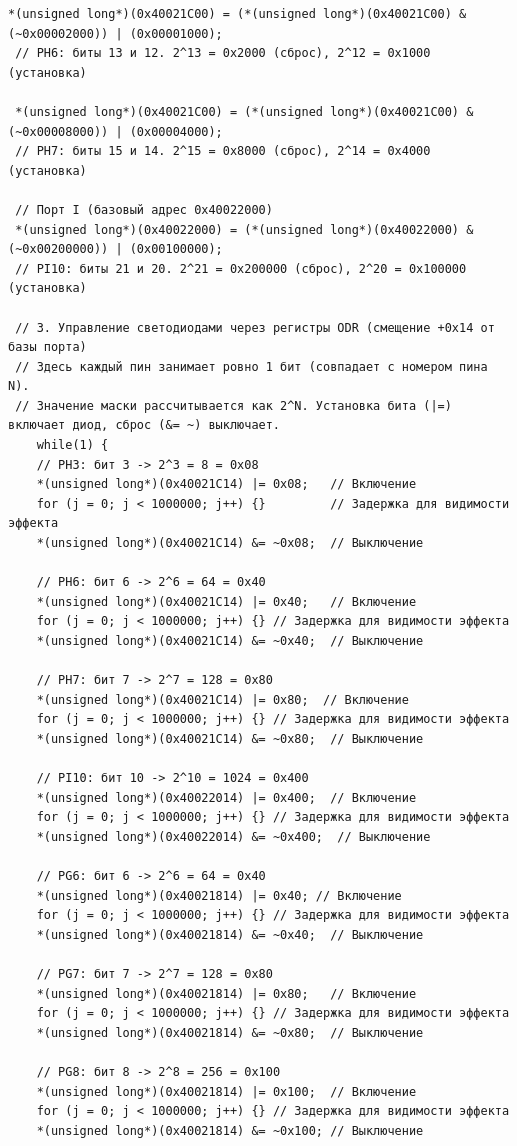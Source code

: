 \begin{lstlisting}[style=cstyle, caption={Основная функция программы}]
 *(unsigned long*)(0x40021C00) = (*(unsigned long*)(0x40021C00) & (~0x00002000)) | (0x00001000); 
 // PH6: биты 13 и 12. 2^13 = 0x2000 (сброс), 2^12 = 0x1000 (установка)
 
 *(unsigned long*)(0x40021C00) = (*(unsigned long*)(0x40021C00) & (~0x00008000)) | (0x00004000); 
 // PH7: биты 15 и 14. 2^15 = 0x8000 (сброс), 2^14 = 0x4000 (установка)

 // Порт I (базовый адрес 0x40022000)
 *(unsigned long*)(0x40022000) = (*(unsigned long*)(0x40022000) & (~0x00200000)) | (0x00100000); 
 // PI10: биты 21 и 20. 2^21 = 0x200000 (сброс), 2^20 = 0x100000 (установка)

 // 3. Управление светодиодами через регистры ODR (смещение +0x14 от базы порта)
 // Здесь каждый пин занимает ровно 1 бит (совпадает с номером пина N).
 // Значение маски рассчитывается как 2^N. Установка бита (|=) включает диод, сброс (&= ~) выключает.
	while(1) {
    // PH3: бит 3 -> 2^3 = 8 = 0x08
    *(unsigned long*)(0x40021C14) |= 0x08;   // Включение
    for (j = 0; j < 1000000; j++) {}         // Задержка для видимости эффекта
    *(unsigned long*)(0x40021C14) &= ~0x08;  // Выключение

    // PH6: бит 6 -> 2^6 = 64 = 0x40
    *(unsigned long*)(0x40021C14) |= 0x40;   // Включение
    for (j = 0; j < 1000000; j++) {} // Задержка для видимости эффекта
    *(unsigned long*)(0x40021C14) &= ~0x40;  // Выключение

    // PH7: бит 7 -> 2^7 = 128 = 0x80
    *(unsigned long*)(0x40021C14) |= 0x80;  // Включение
    for (j = 0; j < 1000000; j++) {} // Задержка для видимости эффекта
    *(unsigned long*)(0x40021C14) &= ~0x80;  // Выключение

    // PI10: бит 10 -> 2^10 = 1024 = 0x400
    *(unsigned long*)(0x40022014) |= 0x400;  // Включение
    for (j = 0; j < 1000000; j++) {} // Задержка для видимости эффекта
    *(unsigned long*)(0x40022014) &= ~0x400;  // Выключение

    // PG6: бит 6 -> 2^6 = 64 = 0x40
    *(unsigned long*)(0x40021814) |= 0x40; // Включение   
    for (j = 0; j < 1000000; j++) {} // Задержка для видимости эффекта
    *(unsigned long*)(0x40021814) &= ~0x40;  // Выключение

    // PG7: бит 7 -> 2^7 = 128 = 0x80
    *(unsigned long*)(0x40021814) |= 0x80;   // Включение
    for (j = 0; j < 1000000; j++) {} // Задержка для видимости эффекта
    *(unsigned long*)(0x40021814) &= ~0x80;  // Выключение

    // PG8: бит 8 -> 2^8 = 256 = 0x100
    *(unsigned long*)(0x40021814) |= 0x100;  // Включение
    for (j = 0; j < 1000000; j++) {} // Задержка для видимости эффекта
    *(unsigned long*)(0x40021814) &= ~0x100; // Выключение


\end{lstlisting}
